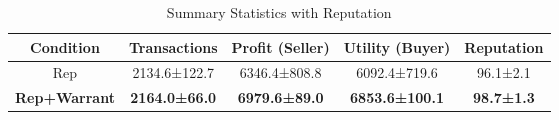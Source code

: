 \begin{table}[t]
    \centering
    \caption{Summary Statistics with Reputation}
    \label{tab:rq1_summary_stats}
    \begin{tabular}{ccccc}
    \toprule
    \textbf{Condition} & \textbf{Transactions} & \textbf{Profit (Seller)} & \textbf{Utility (Buyer)} & \textbf{Reputation} \\
    \midrule
    Rep & 2134.6±122.7 & 6346.4±808.8 & 6092.4±719.6 & 96.1±2.1 \\
    \textbf{Rep+Warrant} & \textbf{2164.0±66.0} & \textbf{6979.6±89.0} & \textbf{6853.6±100.1} & \textbf{98.7±1.3} \\
    \bottomrule
    \end{tabular}
\end{table}
